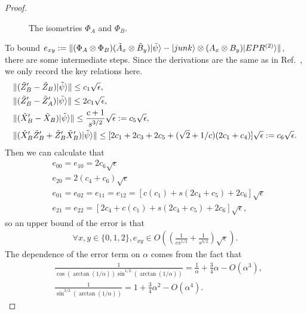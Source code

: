 \documentclass[11pt,letterpaper]{article}
\newcommand{\ket}[1]{|#1\rangle}
\newcommand{\x}{\otimes}
\DeclarePairedDelimiter{\norm}{\lVert}{\rVert}
\newcommand{\1}{\mathbb{1}}
\newcommand{\EPR}[1]{EPR^{(#1)}}
\newcommand{\tA}{\tilde{A}}
\newcommand{\tB}{\tilde{B}}
\newcommand{\tX}{\tilde{X}}
\newcommand{\tZ}{\tilde{Z}}
\newcommand{\tpsi}{\tilde{\psi}}
\theoremstyle{definition}
\begin{document}
\begin{proof}
\begin{figure}[H]
	\caption{The isometries $\Phi_A$ and $\Phi_B$.}
\end{figure}
To bound $e_{xy} := \norm{ (\Phi_A\x\Phi_B) (\tA_x \x \tB_y) \ket{\tpsi} - \ket{junk} \x (A_x\x B_y) \ket{\EPR{2}}}$,
there are some intermediate steps. Since the derivations are the same as in Ref.~\cite{bamps2015}, 
we only record the key relations here.
\begin{align}
	&\norm{(\tZ_B' - \tZ_B) \ket{\tpsi}} \leq c_1 \sqrt{\epsilon},\\
	&\norm{(\tZ_B' - \tZ_A') \ket{\tpsi}} \leq 2c_1 \sqrt{\epsilon}, \\
	&\norm{(\tX_B' - \tX_B) \ket{\tpsi}} \leq \frac{c+1}{s^{3/2}} \sqrt{\epsilon} := c_5\sqrt{\epsilon},\\
	&\norm{(\tX_B'\tZ_B'+ \tZ_B'\tX_B')\ket{\tpsi}} \leq [2c_1 + 2c_3 + 2c_5 + (\sqrt{2}+1/c)(2c_1+c_4)]\sqrt{\epsilon}
	:= c_6 \sqrt{\epsilon}.
\end{align}
Then we can calculate that 
\begin{align}
	&e_{00} = e_{10} = 2c_6 \sqrt{\epsilon}\\
	&e_{20} = 2(c_4 + c_6) \sqrt{\epsilon}\\
	&e_{01} = e_{02} = e_{11} = e_{12} = [c(c_1)+s(2c_4 + c_5) + 2c_6]\sqrt{\epsilon}\\
	&e_{21} = e_{22} = [2c_4 + c(c_1)+s(2c_4 + c_5) + 2c_6]\sqrt{\epsilon},
\end{align}
so an upper bound of the error is that
\begin{align}
	\forall x,y \in \{0,1,2\}, e_{xy} \in O((\frac{1}{cs^{1/2}} + \frac{1}{s^{3/2}})\sqrt{\epsilon}).
\end{align}
The dependence of the error term on $\alpha$ comes from the fact that 
\begin{align}
&\frac{1}{\cos(\arctan(1/\alpha)) \sin^{1/2}(\arctan(1/\alpha))} = \frac{1}{\alpha}+\frac{3}{4}\alpha - O(\alpha^3),\\
&\frac{1}{\sin^{3/2}(\arctan(1/\alpha))} = 1 + \frac{3}{4}\alpha^2 - O(\alpha^4).
\end{align}
\end{proof}
\end{document}
